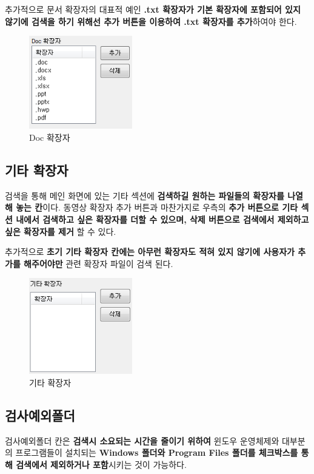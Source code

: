 \documentclass[a4paper, 13pt]{article} %
\begin{document}
	추가적으로 문서 확장자의 대표적 예인 \textbf{.txt 확장자가 기본 확장자에 포함되어 있지 않기에 검색을 하기 위해선 추가 버튼을 이용하여 .txt 확장자를 추가}하여야 한다.
	
	\begin{figure}[h]
		\centering
		\includegraphics[width=0.4\textwidth]{Figures/Doc}
		\caption{Doc 확장자}
		\label{fig:Doc}
	\end{figure}

	\subsection{기타 확장자}
	검색을 통해 메인 화면에 있는 기타 섹션에 \textbf{검색하길 원하는 파일들의 확장자를 나열해 놓는 칸}이다. 동영상 확장자 추가 버튼과 마찬가지로 우측의 \textbf{추가 버튼으로 기타 섹션 내에서 검색하고 싶은 확장자를 더할 수 있으며, 삭제 버튼으로 검색에서 제외하고 싶은 확장자를 제거} 할 수 있다.
	
	추가적으로 \textbf{초기 기타 확장자 칸에는 아무런 확장자도 적혀 있지 않기에 사용자가 추가를 해주어야만} 관련 확장자 파일이 검색 된다.
	
	\begin{figure}[h]
		\centering
		\includegraphics[width=0.4\textwidth]{Figures/etc}
		\caption{기타 확장자}
		\label{fig:etc}
	\end{figure}

	\subsection{검사예외폴더}	
	검사예외폴더 칸은 \textbf{검색시 소요되는 시간을 줄이기 위하여} 윈도우 운영체제와 대부분의 프로그램들이 설치되는 \textbf{ Windows 폴더와 Program Files 폴더를 체크박스를 통해 검색에서 제외하거나 포함}시키는 것이 가능하다.
	
\end{document}
